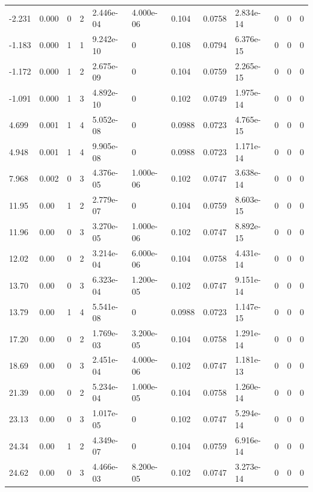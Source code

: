 \documentclass[preview]{standalone}
\begin{document}
{{\begin{tabular}{L{1.2cm}C{1.2cm} C{0.3cm}C{0.5cm} C{1.4cm}C{1.4cm} C{1.4cm}C{1.4cm} C{1.6cm}C{1.6cm} C{1.6cm}C{1.6cm}}
  -2.231  &  0.000  & 0     &  2 &  2.446e-04  & 4.000e-06  &  0.104&   0.0758& 2.834e-14 & 0   &  0 & 0  \\ 
  -1.183  &  0.000  & 1     &  1 &  9.242e-10  & 0  &  0.108&   0.0794& 6.376e-15 & 0   &  0 & 0  \\ 
  -1.172  &  0.000  & 1     &  2 &  2.675e-09  & 0  &  0.104&   0.0759& 2.265e-15 & 0   &  0 & 0  \\ 
  -1.091  &  0.000  & 1     &  3 &  4.892e-10  & 0  &  0.102&   0.0749& 1.975e-14 & 0   &  0 & 0  \\ 
  4.699  &  0.001  & 1     &  4 &  5.052e-08  & 0  &  0.0988&   0.0723& 4.765e-15 & 0   &  0 & 0  \\ 
  4.948  &  0.001  & 1     &  4 &  9.905e-08  & 0  &  0.0988&   0.0723& 1.171e-14 & 0   &  0 & 0  \\ 
  7.968  &  0.002  & 0     &  3 &  4.376e-05  & 1.000e-06  &  0.102&   0.0747& 3.638e-14 & 0   &  0 & 0  \\ 
  11.95  &  0.00  & 1     &  2 &  2.779e-07  & 0  &  0.104&   0.0759& 8.603e-15 & 0   &  0 & 0  \\ 
  11.96  &  0.00  & 0     &  3 &  3.270e-05  & 1.000e-06  &  0.102&   0.0747& 8.892e-15 & 0   &  0 & 0  \\ 
  12.02  &  0.00  & 0     &  2 &  3.214e-04  & 6.000e-06  &  0.104&   0.0758& 4.431e-14 & 0   &  0 & 0  \\ 
  13.70  &  0.00  & 0     &  3 &  6.323e-04  & 1.200e-05  &  0.102&   0.0747& 9.151e-14 & 0   &  0 & 0  \\ 
  13.79  &  0.00  & 1     &  4 &  5.541e-08  & 0  &  0.0988&   0.0723& 1.147e-15 & 0   &  0 & 0  \\ 
  17.20  &  0.00  & 0     &  2 &  1.769e-03  & 3.200e-05  &  0.104&   0.0758& 1.291e-14 & 0   &  0 & 0  \\ 
  18.69  &  0.00  & 0     &  3 &  2.451e-04  & 4.000e-06  &  0.102&   0.0747& 1.181e-13 & 0   &  0 & 0  \\ 
  21.39  &  0.00  & 0     &  2 &  5.234e-04  & 1.000e-05  &  0.104&   0.0758& 1.260e-14 & 0   &  0 & 0  \\ 
  23.13  &  0.00  & 0     &  3 &  1.017e-05  & 0  &  0.102&   0.0747& 5.294e-14 & 0   &  0 & 0  \\ 
  24.34  &  0.00  & 1     &  2 &  4.349e-07  & 0  &  0.104&   0.0759& 6.916e-14 & 0   &  0 & 0  \\ 
  24.62  &  0.00  & 0     &  3 &  4.466e-03  & 8.200e-05  &  0.102&   0.0747& 3.273e-14 & 0   &  0 & 0  \\ 

\end{tabular}}}
\end{document}
